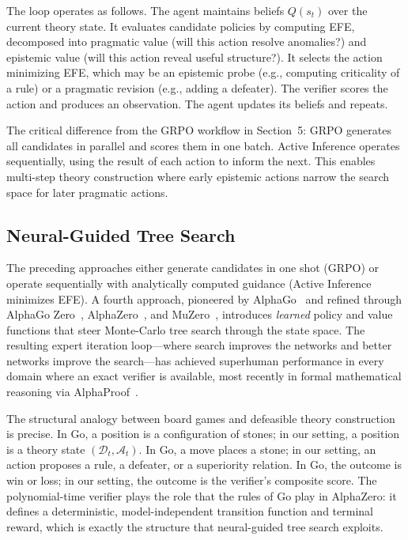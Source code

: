 \documentclass{article}
\newcommand{\D}{\mathcal{D}}
\begin{document}
The loop operates as follows. The agent maintains beliefs $Q(s_t)$ over the current theory state. It evaluates candidate policies by computing EFE, decomposed into pragmatic value (will this action resolve anomalies?) and epistemic value (will this action reveal useful structure?). It selects the action minimizing EFE, which may be an epistemic probe (e.g., computing criticality of a rule) or a pragmatic revision (e.g., adding a defeater). The verifier scores the action and produces an observation. The agent updates its beliefs and repeats.

The critical difference from the GRPO workflow in Section~5: GRPO generates all candidates in parallel and scores them in one batch. Active Inference operates sequentially, using the result of each action to inform the next. This enables multi-step theory construction where early epistemic actions narrow the search space for later pragmatic actions.

\subsection{Neural-Guided Tree Search}

The preceding approaches either generate candidates in one shot (GRPO) or operate sequentially with analytically computed guidance (Active Inference minimizes EFE). A fourth approach, pioneered by AlphaGo~\cite{silver2016alphago} and refined through AlphaGo Zero~\cite{silver2017alphagozero}, AlphaZero~\cite{silver2018alphazero}, and MuZero~\cite{schrittwieser2020muzero}, introduces \emph{learned} policy and value functions that steer Monte-Carlo tree search through the state space. The resulting expert iteration loop---where search improves the networks and better networks improve the search---has achieved superhuman performance in every domain where an exact verifier is available, most recently in formal mathematical reasoning via AlphaProof~\cite{alphaproof2025}.

The structural analogy between board games and defeasible theory construction is precise. In Go, a position is a configuration of stones; in our setting, a position is a theory state $(\D_t, \mathcal{A}_t)$. In Go, a move places a stone; in our setting, an action proposes a rule, a defeater, or a superiority relation. In Go, the outcome is win or loss; in our setting, the outcome is the verifier's composite score. The polynomial-time verifier plays the role that the rules of Go play in AlphaZero: it defines a deterministic, model-independent transition function and terminal reward, which is exactly the structure that neural-guided tree search exploits.
\end{document}
